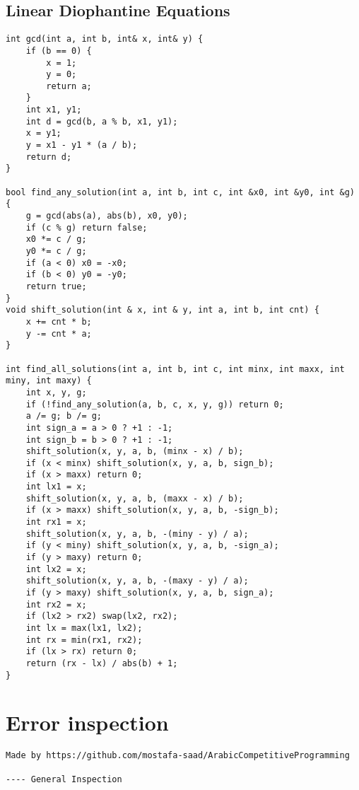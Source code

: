 \documentclass[12pt,a4paper,onesided]{article}
\begin{document}
\begin{multicols}{3}
\subsection{Linear Diophantine Equations}
\begin{lstlisting}
int gcd(int a, int b, int& x, int& y) {
    if (b == 0) {
        x = 1;
        y = 0;
        return a;
    }
    int x1, y1;
    int d = gcd(b, a % b, x1, y1);
    x = y1;
    y = x1 - y1 * (a / b);
    return d;
}

bool find_any_solution(int a, int b, int c, int &x0, int &y0, int &g) {
    g = gcd(abs(a), abs(b), x0, y0);
    if (c % g) return false;
    x0 *= c / g;
    y0 *= c / g;
    if (a < 0) x0 = -x0;
    if (b < 0) y0 = -y0;
    return true;
}
void shift_solution(int & x, int & y, int a, int b, int cnt) {
    x += cnt * b;
    y -= cnt * a;
}

int find_all_solutions(int a, int b, int c, int minx, int maxx, int miny, int maxy) {
    int x, y, g;
    if (!find_any_solution(a, b, c, x, y, g)) return 0;
    a /= g; b /= g;
    int sign_a = a > 0 ? +1 : -1;
    int sign_b = b > 0 ? +1 : -1;
    shift_solution(x, y, a, b, (minx - x) / b);
    if (x < minx) shift_solution(x, y, a, b, sign_b);
    if (x > maxx) return 0;
    int lx1 = x;
    shift_solution(x, y, a, b, (maxx - x) / b);
    if (x > maxx) shift_solution(x, y, a, b, -sign_b);
    int rx1 = x;
    shift_solution(x, y, a, b, -(miny - y) / a);
    if (y < miny) shift_solution(x, y, a, b, -sign_a);
    if (y > maxy) return 0;
    int lx2 = x;
    shift_solution(x, y, a, b, -(maxy - y) / a);
    if (y > maxy) shift_solution(x, y, a, b, sign_a);
    int rx2 = x;
    if (lx2 > rx2) swap(lx2, rx2);
    int lx = max(lx1, lx2);
    int rx = min(rx1, rx2);
    if (lx > rx) return 0;
    return (rx - lx) / abs(b) + 1;
}
\end{lstlisting}


\section{Error inspection}
\begin{lstlisting}
Made by https://github.com/mostafa-saad/ArabicCompetitiveProgramming

---- General Inspection


\end{lstlisting}
\end{multicols}
\end{document}
